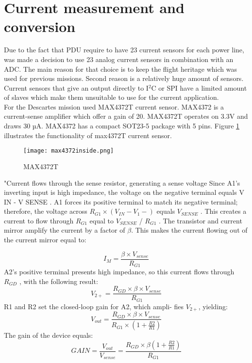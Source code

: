 \section{Current measurement and conversion}

Due to the fact that PDU require to have 23 current sensors for each power line, was made a decision to use 23 analog current sensors in combination with an ADC. The main reason for that choice is to keep the flight heritage which was used for previous missions. Second reason is a relatively huge amount of sensors. Current sensors that give an output directly to I$^2$C or SPI have a limited amount of slaves which make them unsuitable to use for the current application.\\

For the Descartes mission used MAX4372T current sensor. MAX4372 is a current-sense amplifier which offer a gain of 20. MAX4372T operates on 3.3V and draws 30 µA. MAX4372 has a compact SOT23-5 package with 5 pins. Figure \ref{fig: max4372t_inside} illustrates the functionality of max4372T current sensor.

 \begin{figure}[h]
 	\centering
 	\texttt{[image: max4372inside.png]}
 	\caption{MAX4372T \cite{24}}
 	\label{fig: max4372t_inside}
 \end{figure} 

\cite{23}"Current flows through the sense resistor, generating a
sense voltage  Since
A1’s inverting input is high impedance, the voltage on
the negative terminal equals V IN - V SENSE . A1 forces its
positive terminal to match its negative terminal; therefore,
the voltage across $R_{G1}\times (V_{IN} - V_{1}-)$ equals $V_{SENSE}$ . This
creates a current to flow through $R_{G1}$ equal to $V_{SENSE}$ /
$R_{G1}$ . The transistor and current mirror amplify the current
by a factor of $\beta$. This makes the current flowing out of the
current mirror equal to: 

 \begin{equation}
I_{M} = \frac{\beta \times V_{sense}}{R_{G1}}
 \end{equation}
 A2’s positive terminal presents high impedance, so this
 current flows through $R_{GD}$ , with the following result:
  \begin{equation}
V_{2+} = \frac{R_{GD} \times \beta \times V_{sense}}{R_{G1}}
  \end{equation}
  R1 and R2 set the closed-loop gain for A2, which ampli-
  fies $V_{2+}$, yielding:
  \begin{equation}
  V_{out} = \frac{R_{GD} \times \beta \times V_{sense}}{R_{G1} \times (1+\frac{R2}{R1})	 }
  \end{equation}
The gain of the device equals:
  \begin{equation}
  GAIN =\frac{V_{out}}{V_{sense}} = \frac{R_{GD} \times \beta (1+\frac{R2}{R1})}{R_{G1}}
  \end{equation}
  
